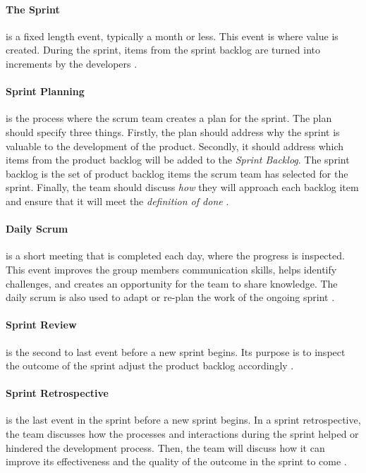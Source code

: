 \paragraph{The Sprint}
is a fixed length event, typically a month or less.
This event is where value is created. 
During the sprint, items from the sprint backlog are turned into increments by the developers \cite{schwaber_sutherland_2022}.

\paragraph{Sprint Planning}
is the process where the scrum team creates a plan for the sprint. 
The plan should specify three things. 
Firstly, the plan should address why the sprint is valuable to the development of the product. 
Secondly, it should address which items from the product backlog will be added to the \emph{Sprint Backlog}. 
The sprint backlog is the set of product backlog items the scrum team has selected for the sprint. 
Finally, the team should discuss \emph{how} they will approach each backlog item and ensure that it will meet the \emph{definition of done} \cite{schwaber_sutherland_2022}.


\paragraph{Daily Scrum}
is a short meeting that is completed each day, where the progress is inspected.
This event improves the group members communication skills, helps identify challenges, and creates an opportunity for the team to share knowledge.
The daily scrum is also used to adapt or re-plan the work of the ongoing sprint \cite{schwaber_sutherland_2022}.

\paragraph{Sprint Review}
is the second to last event before a new sprint begins.
Its purpose is to inspect the outcome of the sprint adjust the product backlog accordingly \cite{schwaber_sutherland_2022}.

\paragraph{Sprint Retrospective}
is the last event in the sprint before a new sprint begins. 
In a sprint retrospective, the team discusses how the processes and interactions during the sprint helped or hindered the development process. 
Then, the team will discuss how it can improve its effectiveness and the quality of the outcome in the sprint to come \cite{schwaber_sutherland_2022}.
